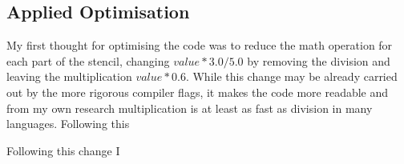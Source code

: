 \documentclass{article}
\begin{document}
    \subsection{Applied Optimisation}
    My first thought for optimising the code was to reduce the math operation for each part of the stencil, changing $value * 3.0/5.0$ by removing the
    division and leaving the multiplication $value * 0.6$. While this change may be already carried out by the more rigorous compiler flags, it makes
    the code more readable and from my own research multiplication is at least as fast as division in many languages.
    Following this 
    
    Following this change I 
    
\end{document}
